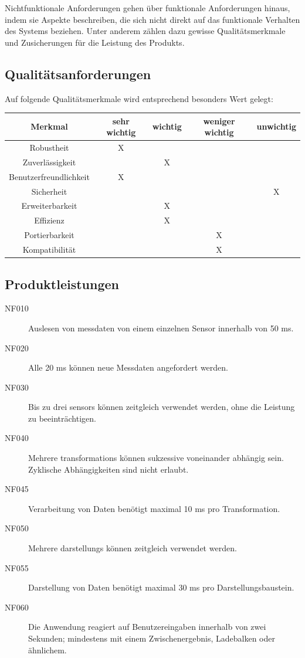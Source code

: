 \documentclass[parskip=full]{scrartcl}
\begin{document}
Nichtfunktionale Anforderungen gehen über funktionale Anforderungen hinaus, indem sie Aspekte beschreiben, die sich nicht direkt auf das funktionale Verhalten des Systems beziehen. Unter anderem zählen dazu gewisse Qualitätsmerkmale und Zusicherungen für die Leistung des Produkts.

\subsection{Qualitätsanforderungen}

Auf folgende Qualitätsmerkmale wird entsprechend besonders Wert gelegt:

\begin{tabular}{ | c | c | c | c | c | }
	\hline
	\textbf{Merkmal} & \textbf{sehr wichtig} & \textbf{wichtig} & \textbf{weniger wichtig} & \textbf{unwichtig} \\
	\hline
	Robustheit & X & & & \\
	Zuverlässigkeit & & X & & \\
	Benutzerfreundlichkeit & X & & & \\
	Sicherheit & & & & X \\
	Erweiterbarkeit & & X & & \\
	Effizienz & & X & & \\
	Portierbarkeit & & & X & \\
	Kompatibilität & & & X & \\
	\hline
\end{tabular}

\subsection{Produktleistungen}

\begin{description}

\item[NF010] Auslesen von \gls{messdaten} von einem einzelnen Sensor innerhalb von 50 ms.
\item[NF020] Alle 20 ms können neue Messdaten angefordert werden.
\item[NF030] Bis zu drei \glspl{sensor} können zeitgleich verwendet werden, ohne die Leistung zu beeinträchtigen.
\item[NF040] Mehrere \glspl{transformation} können sukzessive voneinander abhängig sein. Zyklische Abhängigkeiten sind nicht erlaubt.
\item[NF045] Verarbeitung von Daten benötigt maximal 10 ms pro Transformation.
\item[NF050] Mehrere \glspl{darstellung} können zeitgleich verwendet werden.
\item[NF055] Darstellung von Daten benötigt maximal 30 ms pro Darstellungsbaustein.
\item[NF060] Die Anwendung reagiert auf Benutzereingaben innerhalb von zwei Sekunden; mindestens mit einem Zwischenergebnis, Ladebalken oder ähnlichem.

\end{description}
\end{document}
